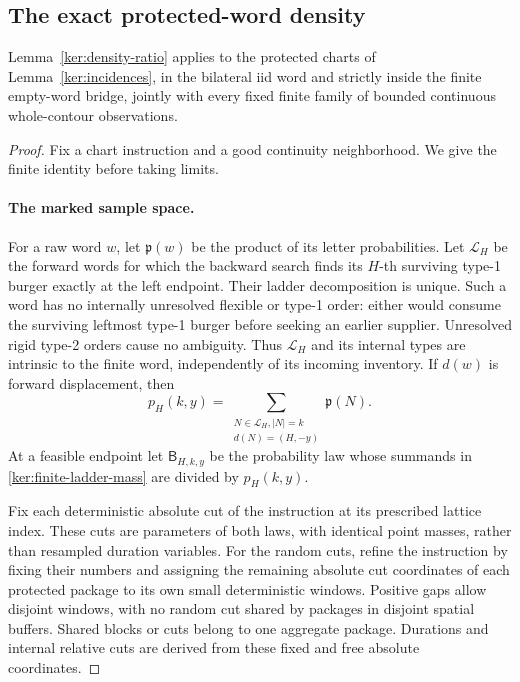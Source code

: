 \subsection{The exact protected-word density}

\begin{lemma}\label{ker:word-ratio}
Lemma~\ref{ker:density-ratio} applies to the protected charts of
Lemma~\ref{ker:incidences}, in the bilateral iid word and strictly
inside the finite empty-word bridge, jointly with every fixed finite
family of bounded continuous whole-contour observations.
\end{lemma}

\begin{proof}
Fix a chart instruction and a good continuity neighborhood.  We give
the finite identity before taking limits.

\paragraph{The marked sample space.}
For a raw word \(w\), let \(\mathfrak p(w)\) be the product of its
letter probabilities.  Let \(\mathcal L_H\) be the forward words for
which the backward search finds its \(H\)-th surviving type-1 burger
exactly at the left endpoint.  Their ladder decomposition is unique.
Such a word has no internally unresolved flexible or type-1 order:
either would consume the surviving leftmost type-1 burger before
seeking an earlier supplier.  Unresolved rigid type-2 orders cause
no ambiguity.  Thus \(\mathcal L_H\) and its internal types are
intrinsic to the finite word, independently of its incoming inventory.
If \(d(w)\) is forward displacement, then
\begin{equation}\label{ker:finite-ladder-mass}
 p_H(k,y)=\sum_{\substack{N\in\mathcal L_H, |N|=k\\
                         d(N)=(H,-y)}}\mathfrak p(N).
\end{equation}
At a feasible endpoint let \(\mathsf B_{H,k,y}\) be the probability
law whose summands in \eqref{ker:finite-ladder-mass} are divided by
\(p_H(k,y)\).

Fix each deterministic absolute cut of the instruction at its
prescribed lattice index. These cuts are parameters of both laws,
with identical point masses, rather than resampled duration variables.
For the random cuts, refine the instruction by fixing their numbers
and assigning the remaining absolute cut coordinates of each
protected package to its own small deterministic windows. Positive
gaps allow disjoint windows, with no random cut shared by packages
in disjoint spatial buffers. Shared blocks or cuts belong to one
aggregate package. Durations and internal relative cuts are derived
from these fixed and free absolute coordinates.


\end{proof}
